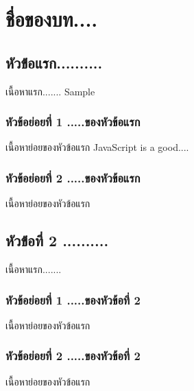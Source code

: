 \chapter{ชื่อของบท....}

\section{หัวข้่อแรก..........}
เนื้อหาแรก....... \Gls{Sample}

\subsection{หัวข้อย่อยที่ 1 .....ของหัวข้อแรก}
เนื้อหาย่อยของหัวข้อแรก  JavaScript   is a good....\textcite{flanagan2016javascript}

\subsection{หัวข้อย่อยที่ 2 .....ของหัวข้อแรก}
เนื้อหาย่อยของหัวข้อแรก


\section{หัวข้่อที่ 2 ..........}
เนื้อหาแรก.......

\subsection{หัวข้อย่อยที่ 1 .....ของหัวข้อที่ 2}
เนื้อหาย่อยของหัวข้อแรก

\subsection{หัวข้อย่อยที่ 2 .....ของหัวข้อที่ 2}
เนื้อหาย่อยของหัวข้อแรก